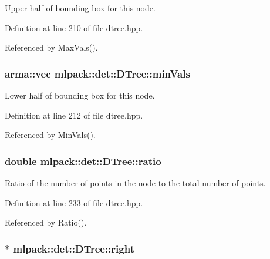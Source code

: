 Upper half of bounding box for this node. 



Definition at line 210 of file dtree.\-hpp.



Referenced by Max\-Vals().

\subsubsection[{min\-Vals}]{\setlength{\rightskip}{0pt plus 5cm}arma\-::vec mlpack\-::det\-::\-D\-Tree\-::min\-Vals\hspace{0.3cm}{\ttfamily [private]}}\label{classmlpack_1_1det_1_1DTree_a1979dd16af92e64197c62bef74f5378e}


Lower half of bounding box for this node. 



Definition at line 212 of file dtree.\-hpp.



Referenced by Min\-Vals().

\subsubsection[{ratio}]{\setlength{\rightskip}{0pt plus 5cm}double mlpack\-::det\-::\-D\-Tree\-::ratio\hspace{0.3cm}{\ttfamily [private]}}\label{classmlpack_1_1det_1_1DTree_a186aee0714a3a707d322aa08cee34f6d}


Ratio of the number of points in the node to the total number of points. 



Definition at line 233 of file dtree.\-hpp.



Referenced by Ratio().

\subsubsection[{right}]{$\ast$ mlpack\-::det\-::\-D\-Tree\-::right\hspace{0.3cm}{\ttfamily [private]}}\label{classmlpack_1_1det_1_1DTree_a7b849536a8a19c2e8bc1999d54e4cc9e}


